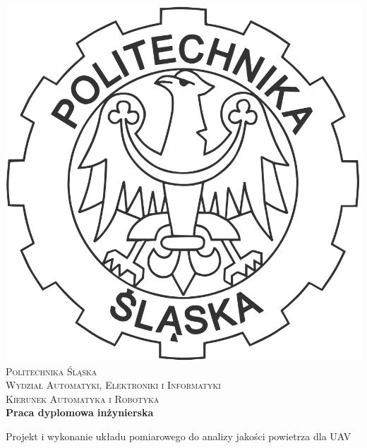 
\newpage
\thispagestyle{empty}





\begin{onehalfspacing}
\begin{center}

\centering
\includegraphics[keepaspectratio,scale=0.1]{./figures/godlo.PNG} \\[.8cm]


{\fontsize{17}{17}\selectfont
\textsc{Politechnika Śląska \\[.3cm]
Wydział Automatyki, Elektroniki i Informatyki  \\[.3cm]
Kierunek Automatyka i Robotyka  \\[2.5cm]}
\textbf{Praca dyplomowa inżynierska \\[1.7cm]}}



\large 
{Projekt i wykonanie układu pomiarowego do analizy jakości powietrza dla UAV} \\[2.3cm]



\end{center}
\end{onehalfspacing}
